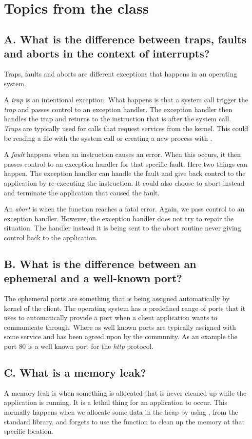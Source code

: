 \section{Topics from the class}

\subsection{A. What is the difference between traps, faults and aborts in the context of interrupts?}
Traps, faults and aborts are different exceptions that happens in an operating system.

A \textit{trap} is an intentional exception. What happens is that a system call trigger the \textit{trap} and passes control 
to an exception handler. The exception handler then handles the trap and returns to the instruction that is after the system call.
\textit{Traps} are typically used for calls that request services from the kernel. This could be reading a file with the system call 
or creating a new process with .

A \textit{fault} happens when an instruction causes an error. When this occurs, it then passes control to an exception handler for that specific fault.
Here two things can happen. The exception handler can handle the fault and give back control to the application by re-executing the instruction. 
It could also choose to abort instead and terminate the application that caused the fault.

An \textit{abort} is when the function reaches a fatal error. Again, we pass control to an exception handler.
However, the exception handler does not try to repair the situation. The handler instead it is being sent to the abort routine 
never giving control back to the application.

\subsection{B. What is the difference between an ephemeral and a well-known port?}
The ephemeral ports are something that is being assigned automatically by kernel of the client. The operating system has a predefined range of ports that it uses to automatically provide a port when a client application wants to communicate through. 
Where as well known ports are typically assigned with some service and has been 
agreed upon by the community. As an example the port 80 is a well known port for the \textit{http} protocol.

\subsection{C. What is a memory leak?}
A memory leak is when something is allocated that is never cleaned up while the application is running. 
It is a lethal thing for an application to occur. This normally happens when we allocate some data in the heap
by using , from the standard library, and forgets to use the function  to clean up the memory
at that specific location.

